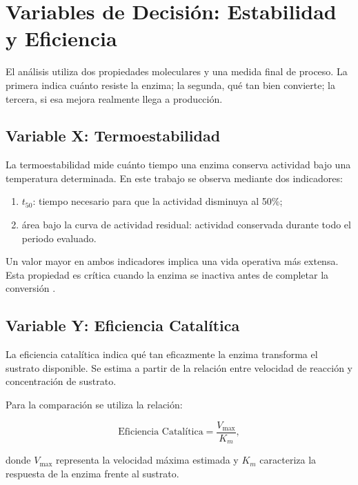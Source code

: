 \section{Variables de Decisión: Estabilidad y Eficiencia}
\label{sec:variables}

El análisis utiliza dos propiedades moleculares y una medida final de proceso.
La primera indica cuánto resiste la enzima; la segunda, qué tan bien convierte;
la tercera, si esa mejora realmente llega a producción.

\subsection{Variable X: Termoestabilidad}
\label{subsec:termoestabilidad}

La termoestabilidad mide cuánto tiempo una enzima conserva actividad bajo una
temperatura determinada. En este trabajo se observa mediante dos indicadores:

\begin{enumerate}
    \item \(t_{50}\): tiempo necesario para que la actividad disminuya al 50\%;
    \item área bajo la curva de actividad residual: actividad conservada durante
    todo el periodo evaluado.
\end{enumerate}

Un valor mayor en ambos indicadores implica una vida operativa más extensa.
Esta propiedad es crítica cuando la enzima se inactiva antes de completar la
conversión \citep{siddiqui_defying_2017,hou_tradeoff_2023}.

\subsection{Variable Y: Eficiencia Catalítica}
\label{subsec:eficiencia}

La eficiencia catalítica indica qué tan eficazmente la enzima transforma el
sustrato disponible. Se estima a partir de la relación entre velocidad de
reacción y concentración de sustrato.

Para la comparación se utiliza la relación:

\begin{equation}
\text{Eficiencia Catalítica}
=
\frac{V_{\max}}{K_m},
\end{equation}

donde \(V_{\max}\) representa la velocidad máxima estimada y \(K_m\) caracteriza
la respuesta de la enzima frente al sustrato.

